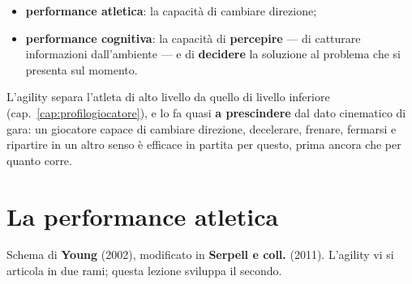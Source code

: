 \begin{itemize}
  \item \textbf{performance atletica}: la capacità di cambiare direzione;
  \item \textbf{performance cognitiva}: la capacità di \textbf{percepire} --- di catturare
    informazioni dall'ambiente --- e di \textbf{decidere} la soluzione al problema che si presenta
    sul momento.
\end{itemize}

L'agility separa l'atleta di alto livello da quello di livello inferiore
(cap.~\ref{cap:profilogiocatore}), e lo fa quasi \textbf{a prescindere} dal dato cinematico di
gara: un giocatore capace di cambiare direzione, decelerare, frenare, fermarsi e ripartire in un
altro senso è efficace in partita per questo, prima ancora che per quanto corre.

\section{La performance atletica}

Schema di \textbf{Young} (2002), modificato in \textbf{Serpell e coll.} (2011). L'agility vi si
articola in due rami; questa lezione sviluppa il secondo.

